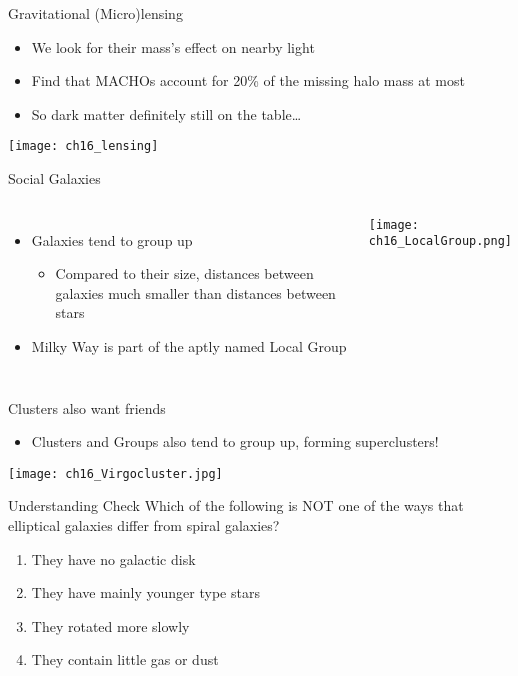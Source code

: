 \documentclass[pdf, aspectratio=169]{beamer}
\begin{document}
\begin{frame}{Gravitational (Micro)lensing}
  \begin{itemize}
	\item We look for their mass's effect on nearby light
	\item Find that MACHOs account for 20\% of the missing halo mass at most
	\item So dark matter definitely still on the table\ldots
  \end{itemize}
  \begin{center}
	\texttt{[image: ch16\_lensing]}
  \end{center}
\end{frame}
\begin{frame}{Social Galaxies}
  \begin{columns}
	\begin{itemize}
	  \item Galaxies tend to group up
		\begin{itemize}
		  \item Compared to their size, distances between galaxies much smaller than distances between stars
		\end{itemize}
	  \item Milky Way is part of the aptly named Local Group
	\end{itemize}
	\begin{center}
	  \texttt{[image: ch16\_LocalGroup.png]}
	\end{center}
  \end{columns}
\end{frame}

\begin{frame}{Clusters also want friends}
  \begin{itemize}
	\item Clusters and Groups also tend to group up, forming \alert{superclusters}!
  \end{itemize}
  \begin{center}
	\texttt{[image: ch16\_Virgocluster.jpg]}
  \end{center}
\end{frame}


\begin{frame}{Understanding Check}
  Which of the following is NOT one of the ways that elliptical galaxies differ from spiral galaxies?
  \begin{enumerate}
	\item They have no galactic disk
	\item \alert<2>{They have mainly younger type stars}
	\item They rotated more slowly
	\item They contain little gas or dust
  \end{enumerate}
\end{frame}
\end{document}

